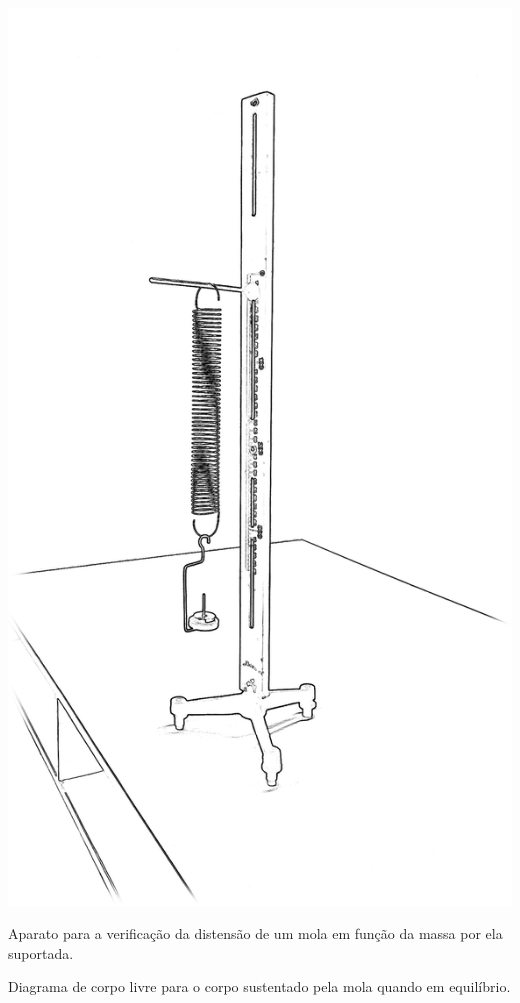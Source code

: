\begin{marginfigure}[-3cm]
\includegraphics[width=\textwidth]{Ilustrations/Hooke.png}
\caption{Aparato para a verificação da distensão de um mola em função da massa por ela suportada.\label{Fig:IlustracaoLeiDeHooke}}
\end{marginfigure}

\begin{marginfigure}
\centering
{}
\caption{Diagrama de corpo livre para o corpo sustentado pela mola quando em equilíbrio.}
\label{DiagramaCorpoLivre}
\end{marginfigure}

